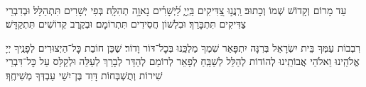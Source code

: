 {\\
עַד מָרוֹם וְקָדוֹשׁ שְׁמוֹ וְכָתוּב׃ רַֽנֲנ֣וּ צַ֭דִּיקִים בַּֽיְיָ֑ לַ֝יְשָׁרִ֗ים נָאוָ֥ה תְהִלָּֽה׃ בְּפִי יְשָׁרִים תִּתְהַלָּל׃ וּבְדִבְרֵי צַדִּיקִים תִּתְבָּרַךְ׃ וּבִלְשׁוֹן חֲסִידִים תִּתְרוֹמָם׃ וּבְקֶֽרֶב קְדוֹשִׁים תִּתְקַדָּשׁ׃

רִבְבוֹת עַמְּךָ בֵּית יִשְׂרָאֵל בְּרִנָּה יִתְפָּאַר שִׁמְךָ מַלְכֵּֽנוּ בְּכׇל־דּוֹר וָדוֹר׃ שֶׁכֵּן חוֹבַת כׇּל־הַיְצוּרִים לְפָנֶֽיךָ יְיָ אֱלֹהֵֽינוּ וֵאלֹהֵי אֲבוֹתֵֽינוּ לְהוֹדוֹת לְהַלֵּל לְשַׁבֵּֽחַ לְפָאֵר לְרוֹמֵם לְהַדֵּר לְבָרֵךְ לְעַלֵּה וּלְקַלֵּס עַל כׇּל־דִּבְרֵי שִׁירוֹת וְתֻשְׁבְּחוֹת דָּוִד בֶּן־יִשַׁי עַבְדְּךָ מְשִׁיחֶֽךָ׃

\yishtabach

\mimaamakim
\halfkaddish
}{}